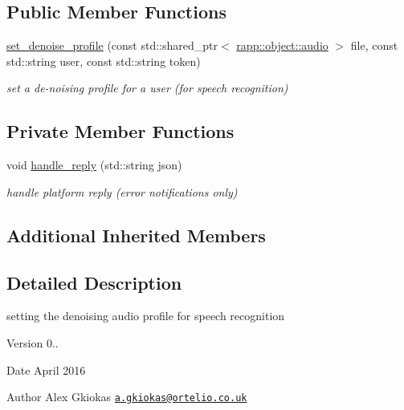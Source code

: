 \subsection*{Public Member Functions}
\begin{DoxyCompactItemize}
\item 
\hyperlink{classrapp_1_1cloud_1_1set__denoise__profile_a4b89d167cc316f38561064a3ea541b4e}{set\-\_\-denoise\-\_\-profile} (const std\-::shared\-\_\-ptr$<$ \hyperlink{classrapp_1_1object_1_1audio}{rapp\-::object\-::audio} $>$ file, const std\-::string user, const std\-::string token)
\begin{DoxyCompactList}\small\item\em set a de-\/noising profile for a user (for speech recognition) \end{DoxyCompactList}\end{DoxyCompactItemize}
\subsection*{Private Member Functions}
\begin{DoxyCompactItemize}
\item 
void \hyperlink{classrapp_1_1cloud_1_1set__denoise__profile_a279b89d935c97d77df896772b3c60292}{handle\-\_\-reply} (std\-::string json)
\begin{DoxyCompactList}\small\item\em handle platform reply (error notifications only) \end{DoxyCompactList}\end{DoxyCompactItemize}
\subsection*{Additional Inherited Members}


\subsection{Detailed Description}
setting the denoising audio profile for speech recognition 

\begin{DoxyVersion}{Version}
0.. 
\end{DoxyVersion}
\begin{DoxyDate}{Date}
April 2016 
\end{DoxyDate}
\begin{DoxyAuthor}{Author}
Alex Gkiokas \href{mailto:a.gkiokas@ortelio.co.uk}{\tt a.\-gkiokas@ortelio.\-co.\-uk} 
\end{DoxyAuthor}



